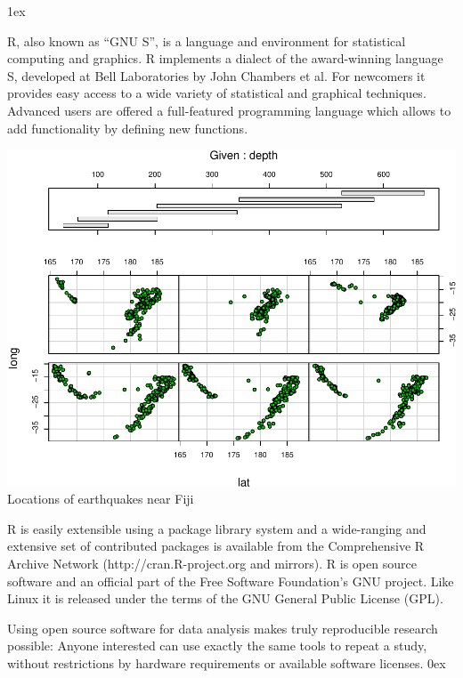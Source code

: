 \documentclass[landscape]{article}
\newlength{\colw}
\newcommand{\column}[1]{\hspace*{9mm}{}
  \parbox[t][0.99\textheight][t]{\colw}{\parskip1ex
    #1\parskip0ex}\hspace{9mm}{}}
\begin{document}
\newpage
\noindent
\column{
  R, also known as ``GNU S'', is a language and environment for
  statistical computing and graphics. R implements a dialect of the
  award-winning language S, developed at Bell Laboratories by John
  Chambers et al. For newcomers it provides easy access to a wide
  variety of statistical and graphical techniques. Advanced users are
  offered a full-featured programming language which allows to add
  functionality by defining new functions.

  \begin{center}\footnotesize\sf
    \includegraphics[width=\colw]{quakes-coplot}
    Locations of earthquakes near Fiji
  \end{center}

  R is easily extensible using a package library system and a
  wide-ranging and extensive set of contributed packages is available
  from the Comprehensive R Archive Network (http://cran.R-project.org
  and mirrors).  R is open source software and an official part of the
  Free Software Foundation's GNU project. Like Linux it is released
  under the terms of the GNU General Public License (GPL).

  Using open source software for data analysis makes truly
  reproducible research possible: Anyone interested can use exactly
  the same tools to repeat a study, without restrictions by
  hardware requirements or available software licenses.
  }
\end{document}

